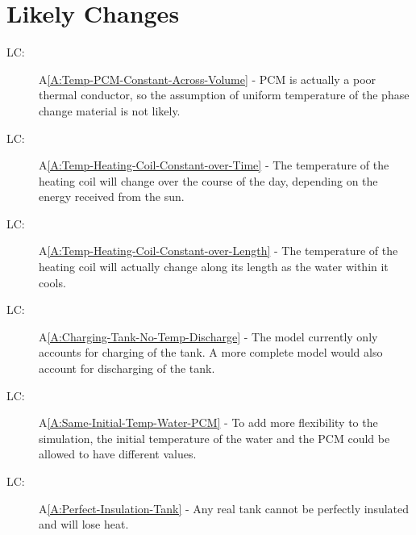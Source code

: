 \documentclass[12pt]{article}
\newcounter{lcnum}
\newcommand{\lcthelcnum}{LC\thelcnum}
\begin{document}
\section{Likely Changes}
\label{Sec:LCs}
\begin{description}
\item[\lcthelcnum\label{LC:Uniform-Temperature-PCM}:]A\ref{A:Temp-PCM-Constant-Across-Volume} - PCM is actually a poor thermal conductor, so the assumption of uniform temperature of the phase change material is not likely.
\end{description}
\begin{description}
\item[\lcthelcnum\label{LC:Temperature-Coil-Variable-Over-Day}:]A\ref{A:Temp-Heating-Coil-Constant-over-Time} - The temperature of the heating coil will change over the course of the day, depending on the energy received from the sun.
\end{description}
\begin{description}
\item[\lcthelcnum\label{LC:Temperature-Coil-Variable-Over-Length}:]A\ref{A:Temp-Heating-Coil-Constant-over-Length} - The temperature of the heating coil will actually change along its length as the water within it cools.
\end{description}
\begin{description}
\item[\lcthelcnum\label{LC:Discharging-Tank}:]A\ref{A:Charging-Tank-No-Temp-Discharge} - The model currently only accounts for charging of the tank. A more complete model would also account for discharging of the tank.
\end{description}
\begin{description}
\item[\lcthelcnum\label{LC:Different-Initial-Temps-PCM-Water}:]A\ref{A:Same-Initial-Temp-Water-PCM} - To add more flexibility to the simulation, the initial temperature of the water and the PCM could be allowed to have different values.
\end{description}
\begin{description}
\item[\lcthelcnum\label{LC:Tank-Lose-Heat}:]A\ref{A:Perfect-Insulation-Tank} - Any real tank cannot be perfectly insulated and will lose heat.
\end{description}
\end{document}
